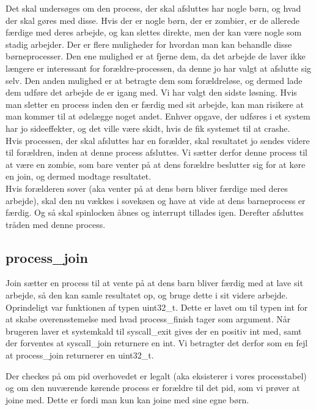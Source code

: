 \documentclass[10pt,a4paper,danish]{article}
\begin{document}
Det skal undersøges om den process, der skal afsluttes har nogle børn, og hvad der skal gøres med disse. Hvis der er nogle børn, der er zombier, er de allerede færdige med deres arbejde, og kan slettes direkte, men der kan være nogle som stadig arbejder. Der er flere muligheder for hvordan man kan behandle disse børneprocesser. Den ene mulighed er at fjerne dem, da det arbejde de laver ikke længere er interessant for forældre-processen, da denne jo har valgt at afslutte sig selv. Den anden mulighed er at betragte dem som forældreløse, og dermed lade dem udføre det arbejde de er igang med. Vi har valgt den sidste løsning. Hvis man sletter en process inden den er færdig med sit arbejde, kan man risikere at man kommer til at ødelægge noget andet. Enhver opgave, der udføres i et system har jo sideeffekter, og det ville være skidt, hvis de fik systemet til at crashe.\\

Hvis processen, der skal afsluttes har en forælder, skal resultatet jo sendes videre til forældren, inden at denne process afsluttes. Vi sætter derfor denne process til at være en zombie, som bare venter på at dens forældre beslutter sig for at køre en join, og dermed modtage resultatet. \\

Hvis forælderen sover (aka venter på at dens børn bliver færdige med deres arbejde), skal den nu vækkes i sovekøen og have at vide at dens barneprocess er færdig. Og så skal spinlocken åbnes og interrupt tillades igen. Derefter afsluttes tråden med denne process.

\subsection{process\_join}
Join sætter en process til at vente på at dens barn bliver færdig med at lave sit arbejde, så den kan samle resultatet op, og bruge dette i sit videre arbejde. Oprindeligt var funktionen af typen uint32\_t.
Dette er lavet om til typen int for at skabe overensstemelse med hvad process_finish tager som argument. Når brugeren laver et systemkald til syscall_exit gives der en positiv int med, samt der forventes at syscall_join returnere en int. Vi betragter det derfor som en fejl at process_join returnerer en uint32_t.


Der checkes på om pid overhovedet er legalt (aka eksisterer i vores processtabel) og om den nuværende kørende process er forældre til det pid, som vi prøver at joine med. Dette er fordi man kun kan joine med sine egne børn.\\
\end{document}
